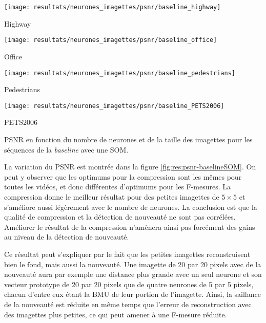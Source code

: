 	\begin{figureth}
		\begin{subfigureth}{.45\textwidth}
			\texttt{[image: resultats/neurones\_imagettes/psnr/baseline\_highway]}\caption{Highway}
		\end{subfigureth}
		\begin{subfigureth}{.45\textwidth}
			\texttt{[image: resultats/neurones\_imagettes/psnr/baseline\_office]}\caption{Office}
		\end{subfigureth}
		\begin{subfigureth}{.45\textwidth}
			\texttt{[image: resultats/neurones\_imagettes/psnr/baseline\_pedestrians]}\caption{Pedestrians}
		\end{subfigureth}
		\begin{subfigureth}{.45\textwidth}
			\texttt{[image: resultats/neurones\_imagettes/psnr/baseline\_PETS2006]}\caption{PETS2006}
		\end{subfigureth}
		\caption[Nombre de neurones et de taille des imagettes, PSNR/SOM/baseline]{PSNR en fonction du nombre de neurones et de la taille des imagettes pour les séquences de la \textit{baseline} avec une SOM.}\label{fig:res:psnr-baselineSOM}
	\end{figureth}

	La variation du PSNR est montrée dans la figure \ref{fig:res:psnr-baselineSOM}. On peut y observer que les optimums pour la compression sont les mêmes pour toutes les vidéos, et donc différentes d'optimums pour les F-mesures. La compression donne le meilleur résultat pour des petites imagettes de $5\times5$ et s'améliore aussi légèrement avec le nombre de neurones. La conclusion est que la qualité de compression et la détection de nouveauté ne sont pas corrélées. Améliorer le résultat de la compression n'amènera ainsi pas forcément des gains au niveau de la détection de nouveauté.

	Ce résultat peut s'expliquer par le fait que les petites imagettes reconstruisent bien le fond, mais aussi la nouveauté. Une imagette de 20 par 20 pixels avec de la nouveauté aura par exemple une distance plus grande avec un seul neurone et son vecteur prototype de 20 par 20 pixels que de quatre neurones de 5 par 5 pixels, chacun d'entre eux étant la BMU de leur portion de l'imagette. Ainsi, la saillance de la nouveauté est réduite en même temps que l'erreur de reconstruction avec des imagettes plus petites, ce qui peut amener à une F-mesure réduite.
	
